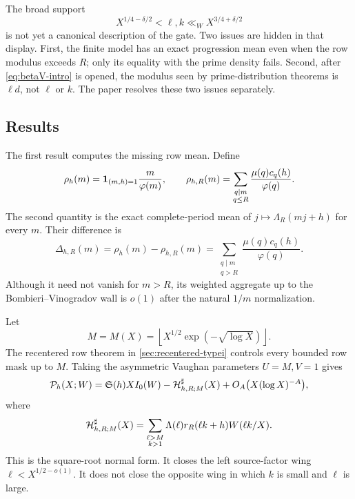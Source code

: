 The broad support
\[
 X^{1/4-\delta/2}<\ell,k
 \ll_W X^{3/4+\delta/2}
\]
is not yet a canonical description of the gate.  Two issues are hidden in
that display.  First, the finite model has an exact progression mean even
when the row modulus exceeds $R$; only its equality with the prime density
fails.  Second, after \eqref{eq:betaV-intro} is opened, the modulus seen by
prime-distribution theorems is $\ell d$, not $\ell$ or $k$.  The paper
resolves these two issues separately.

\subsection{Results}

The first result computes the missing row mean.  Define
\begin{equation}
 \rho_h(m)=\mathbf 1_{(m,h)=1}\frac m{\varphi(m)},
 \qquad
 \rho_{h,R}(m)=
 \sum_{\substack{q\mid m\\q\le R}}
 \frac{\mu(q)c_q(h)}{\varphi(q)}.
 \label{eq:two-row-means-intro}
\end{equation}
The second quantity is the exact complete-period mean of
$j\mapsto\Lambda_R(mj+h)$ for every $m$.  Their difference is
\begin{equation}
 \Delta_{h,R}(m)=\rho_h(m)-\rho_{h,R}(m)
 =\sum_{\substack{q\mid m\\q>R}}
 \frac{\mu(q)c_q(h)}{\varphi(q)}.
 \label{eq:cutoff-drift-intro}
\end{equation}
Although it need not vanish for $m>R$, its weighted aggregate up to the
Bombieri--Vinogradov wall is $o(1)$ after the natural $1/m$ normalization.

Let
\begin{equation}
 M=M(X)=
 \left\lfloor X^{1/2}\exp(-\sqrt{\log X})\right\rfloor.
 \label{eq:near-square-root-M}
\end{equation}
The recentered row theorem in \cref{sec:recentered-typei} controls every
bounded row mask up to $M$.  Taking the asymmetric Vaughan parameters
$U=M,V=1$ gives
\begin{equation}
 \mathcal P_h(X;W)=\mathfrak S(h)XI_0(W)
 -\mathcal H^\sharp_{h,R;M}(X)
 +O_A\bigl(X(\log X)^{-A}\bigr),
 \label{eq:square-root-normal-form-intro}
\end{equation}
where
\begin{equation}
 \mathcal H^\sharp_{h,R;M}(X)=
 \sum_{\substack{\ell>M\\k>1}}
 \Lambda(\ell)r_R(\ell k+h)W(\ell k/X).
 \label{eq:Hsharp-intro}
\end{equation}
This is the square-root normal form.  It closes the left source-factor
wing $\ell<X^{1/2-o(1)}$.  It does not close the opposite wing in which
$k$ is small and $\ell$ is large.

